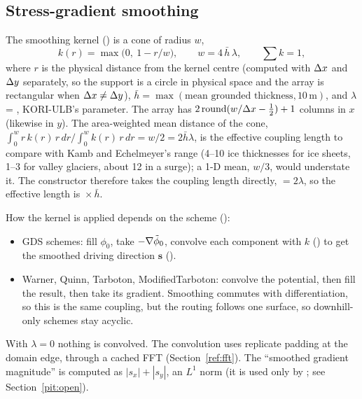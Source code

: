 \subsection{Stress-gradient smoothing}\label{disc:smoothing}
The smoothing kernel () is a cone of radius $w$,
\begin{equation}
k(r) = \max\bigl(0,\ 1 - r/w\bigr), \qquad w = 4\,\bar h\,\lambda, \qquad \textstyle\sum k = 1,
\end{equation}
where $r$ is the physical distance from the kernel centre (computed with $\Delta x$ and $\Delta y$ separately, so the support is
a circle in physical space and the array is rectangular when $\Delta x\ne\Delta y$), $\bar h = \max(\text{mean grounded
thickness}, 10\,\text{m})$, and $\lambda$ = , KORI-ULB's parameter. The array has
$2\,\mathrm{round}(w/\Delta x - \tfrac12) + 1$ columns in $x$ (likewise in $y$). The area-weighted mean distance of the cone,
$\int_0^w r\,k(r)\,r\,dr / \int_0^w k(r)\,r\,dr = w/2 = 2\bar h\lambda$, is the effective coupling length to compare
with Kamb and Echelmeyer's range (4--10 ice thicknesses for ice sheets, 1--3 for valley glaciers, about 12 in a
surge); a 1-D mean, $w/3$, would understate it. The constructor therefore takes the coupling length directly,
 $= 2\lambda$, so the effective length is \,$\times\,\bar h$.

How the kernel is applied depends on the scheme ():
\begin{itemize}[leftmargin=1.5em]
\item GDS schemes: fill $\phi_0$, take $-\nabla{\tilde\phi_0}$, convolve each component with $k$
  () to get the smoothed driving direction $\mathbf s$ ().
\item Warner, Quinn, Tarboton, ModifiedTarboton: convolve the potential, then fill the result, then take its gradient.
  Smoothing commutes with differentiation, so this is the same coupling, but the routing follows one surface, so
  downhill-only schemes stay acyclic.
\end{itemize}
With $\lambda = 0$ nothing is convolved. The convolution uses replicate padding at the domain edge, through a cached FFT
(Section~\ref{ref:fft}). The ``smoothed gradient magnitude''  is computed as $|s_x| + |s_y|$, an
$L^1$ norm (it is used only by ; see Section~\ref{pit:open}).

